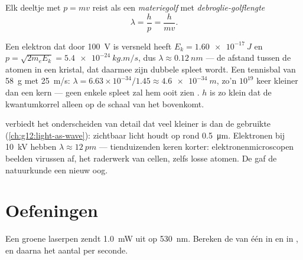 \begin{definition}\label{def:g12:quantum-world:debroglie}
Elk deeltje met  $p = mv$ reist als een
\emph{materiegolf} met
\emph{debroglie-golflengte}
\[
\lambda = \frac{h}{p} = \frac{h}{mv}.
\]
\end{definition}
\admitted

\begin{example}\label{ex:g12:quantum-world:never}
Een elektron dat door \qty{100}{V} is versneld heeft
$E_k = \qty{1.60e-17}{J}$ en $p = \sqrt{2m_e E_k} = \qty{5.4e-24}{kg.m/s}$,
dus $\lambda \approx \qty{0.12}{nm}$ --- de afstand tussen de atomen in een
kristal, dat daarmee zijn dubbele spleet wordt. Een tennisbal van \qty{58}{g}
met \qty{25}{m/s}: $\lambda = 6.63\times10^{-34}/1.45 \approx
\qty{4.6e-34}{m}$, zo'n $10^{19}$ keer kleiner dan een kern --- geen enkele
spleet zal hem ooit zien . $h$ is zo klein dat de kwantumkorrel
alleen op de schaal van het  bovenkomt.
\end{example}

\begin{example}[De elektronenmicroscoop]\label{ex:g12:quantum-world:microscope}
 verbiedt het onderscheiden van detail dat veel kleiner is dan de
gebruikte  (\cref{ch:g12:light-as-wave}): zichtbaar licht houdt op
rond \qty{0.5}{\micro m}. Elektronen bij \qty{10}{kV} hebben
$\lambda \approx \qty{12}{pm}$ --- tienduizenden keren korter:
elektronenmicroscopen beelden virussen af, het raderwerk van cellen, zelfs
losse atomen. De  gaf de natuurkunde een nieuw oog.
\end{example}

\section{Oefeningen}

\begin{exercise}[$\star$]\label{exo:g12:quantum-world:1}
Een groene laserpen zendt \qty{1.0}{mW} uit op \qty{530}{nm}. Bereken de
 van één  in  en in , en daarna het aantal
 per seconde.
\end{exercise}

